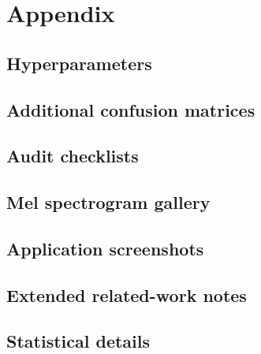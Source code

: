 \section{Appendix}
\label{sec:appendix}

\subsection{Hyperparameters}
\label{app:hyper}

\subsection{Additional confusion matrices}

\subsection{Audit checklists}

\subsection{Mel spectrogram gallery}

\subsection{Application screenshots}

\subsection{Extended related-work notes}

\subsection{Statistical details}
